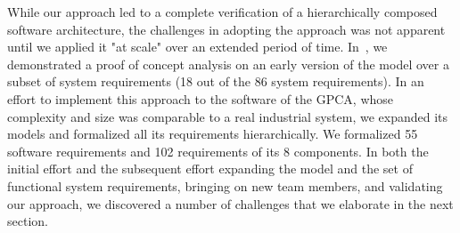 While our approach led to a complete verification of a hierarchically composed software architecture, the challenges in adopting the approach was not apparent until we applied it "at scale" over an extended period of time. In~\cite{hilt2013}, we demonstrated a proof of concept analysis on an early version of the model over a subset of system requirements (18 out of the 86 system requirements). In an effort to implement this approach to the software of the GPCA, whose complexity and size was comparable to a real industrial system, we expanded its models and formalized all its requirements hierarchically. We formalized 55 software requirements and 102 requirements of its 8 components. In both the initial effort and the subsequent effort expanding the model and the set of functional system requirements, bringing on new team members, and validating our approach, we discovered a number of challenges that we elaborate in the next section.


%
%


